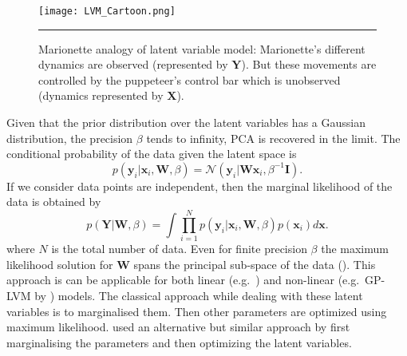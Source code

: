 \begin{figure}
	\centering
		\texttt{[image: LVM\_Cartoon.png]}
		\rule{35em}{0.5pt}
	\caption[Marionette analogy of latent variable model]
		{Marionette analogy of latent variable model: Marionette's different dynamics are observed (represented by $\textbf{Y}$). But these movements are controlled by the puppeteer's control bar which is unobserved (dynamics represented by $\textbf{X}$).}
	\label{fig:LVM_Cartoon}
\end{figure}

Given that the prior distribution over the latent variables has a Gaussian distribution, the precision $\beta$ tends to infinity, PCA is recovered in the limit. The conditional probability of the data given the latent space is
\begin{equation} \label{eq:cond_prob_latent_space}
p\left(\textbf{y}_i|\textbf{x}_i,\textbf{W},\beta \right) = \mathcal{N} \left(\textbf{y}_i|\textbf{W}\textbf{x}_i,\beta^{-1}\textbf{I}\right).
\end{equation}
If we consider data points are independent, then the marginal likelihood of the data is obtained by
\begin{equation} \label{eq:marginal_likelihood_latent_space}
p\left(\textbf{Y}|\textbf{W},\beta \right) = 
\int \prod^{N}_{i=1} p\left(\textbf{y}_i|\textbf{x}_i,\textbf{W},\beta\right)p\left(\textbf{x}_i\right)d\textbf{x}.
\end{equation}
where $N$ is the total number of data. Even for finite precision $\beta$ the maximum likelihood solution for $\textbf{W}$ spans the principal sub-space of the data (\cite{Tipping:1999}). This approach is can be applicable for both linear (e.g.\ \cite{Silva:2006}) and non-linear (e.g.\ GP-LVM by \cite{Lawrence:2005}) models. The classical approach while dealing with these latent variables is to marginalised them. Then other parameters are optimized using maximum likelihood. \cite{Lawrence:2005} used an alternative but similar approach by first marginalising the parameters and then optimizing the latent variables.

